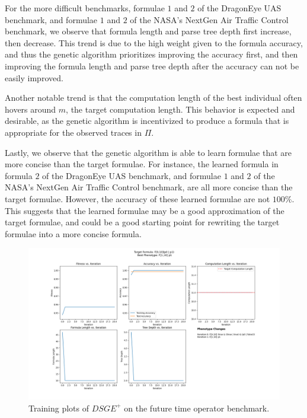 \documentclass[runningheads]{llncs}
\begin{document}
For the more difficult benchmarks, formulae $1$ and $2$ of the DragonEye UAS benchmark, and formulae $1$ and $2$ of the NASA's NextGen Air Traffic Control benchmark, we observe that formula length and parse tree depth first increase, then decrease. 
This trend is due to the high weight given to the formula accuracy, and thus the genetic algorithm prioritizes improving the accuracy first, and then improving the formula length and parse tree depth after the accuracy can not be easily improved.

Another notable trend is that the computation length of the best individual often hovers around $m$, the target computation length.
This behavior is expected and desirable, as the genetic algorithm is incentivized to produce a formula that is appropriate for the observed traces in $\Pi$.

Lastly, we observe that the genetic algorithm is able to learn formulae that are more concise than the target formulae.
For instance, the learned formula in formula $2$ of the DragonEye UAS benchmark, and formulae $1$ and $2$ of the NASA's NextGen Air Traffic Control benchmark, are all more concise than the target formulae.
However, the accuracy of these learned formulae are not $100\%$. 
This suggests that the learned formulae may be a good approximation of the target formulae, and could be a good starting point for rewriting the target formulae into a more concise formula.

\begin{figure}
    \centering
    \includegraphics[width=1.1\textwidth]{figs/log_future.txt.png}
    \caption{Training plots of $DSGE^+$ on the future time operator benchmark.}
    \label{fig:future}
\end{figure}
\end{document}
